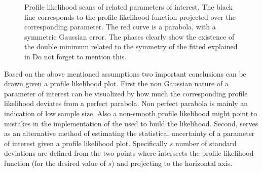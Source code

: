 \begin{figure}[!t]
  \centering
  \begin{subfigure}{0.5\textwidth}
    \scalebox{0.57}{}
    \caption{}
    \label{nll_f0}
  \end{subfigure}%
  \hfill%
  \begin{subfigure}{0.5\textwidth}
    \scalebox{0.57}{}
    \caption{}
    \label{nll_fpar}
  \end{subfigure}
  \begin{subfigure}{0.5\textwidth}
    \scalebox{0.57}{}
    \caption{}
    \label{nll_AparPhase}
  \end{subfigure}%
  \hfill%
  \begin{subfigure}{0.5\textwidth}
    \scalebox{0.57}{}
    \caption{}
    \label{nll_AperpPhase}
  \end{subfigure}
\caption{Profile likelihood scans of \pwave related parameters of interest. The black line corresponds to the profile likelihood
         function projected over the corresponding parameter. The red curve is a parabola, with a symmetric Gaussian
         error. The phases clearly show the existence of the double minimum related to the symmetry of the fitted \pdf
         explained in  {\color{red} Do not forget to mention this}.
        }
\end{figure}

Based on the above mentioned assumptions two important conclusions can be drawn given a profile likelihood plot. First the non
Gaussian nature of a parameter of interest can be visualized by how much the corresponding profile likelihood deviates from
a perfect parabola. Non perfect parabola is mainly an indication of low sample
size. Also a non-smooth profile likelihood might point to mistakes in the implementation of the \pdf
used to build the likelihood. Second,  serves as an alternative method of estimating the statistical uncertainty
of a parameter of interest given a profile likelihood plot. Specifically $s$ number of standard deviations are defined from the two
points where  intersects the profile likelihood function (for the desired value of $s$) and projecting to
the horizontal axis.

